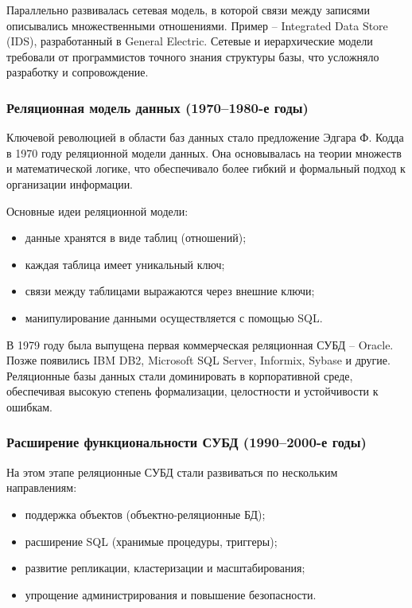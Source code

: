 Параллельно развивалась сетевая модель, в которой связи между записями описывались множественными отношениями. Пример -- Integrated Data Store (IDS), разработанный в General Electric. Сетевые и иерархические модели требовали от программистов точного знания структуры базы, что усложняло разработку и сопровождение.

\subsubsection{Реляционная модель данных (1970--1980-е годы)}

Ключевой революцией в области баз данных стало предложение Эдгара Ф. Кодда в 1970 году реляционной модели данных. Она основывалась на теории множеств и математической логике, что обеспечивало более гибкий и формальный подход к организации информации.

Основные идеи реляционной модели:
\begin{itemize}
	\item данные хранятся в виде таблиц (отношений);
	\item каждая таблица имеет уникальный ключ;
	\item связи между таблицами выражаются через внешние ключи;
	\item манипулирование данными осуществляется с помощью SQL.
\end{itemize}

В 1979 году была выпущена первая коммерческая реляционная СУБД -- Oracle. Позже появились IBM DB2, Microsoft SQL Server, Informix, Sybase и другие. Реляционные базы данных стали доминировать в корпоративной среде, обеспечивая высокую степень формализации, целостности и устойчивости к ошибкам.

\subsubsection{Расширение функциональности СУБД (1990--2000-е годы)}

На этом этапе реляционные СУБД стали развиваться по нескольким направлениям:
\begin{itemize}
	\item поддержка объектов (объектно-реляционные БД);
	\item расширение SQL (хранимые процедуры, триггеры);
	\item развитие репликации, кластеризации и масштабирования;
	\item упрощение администрирования и повышение безопасности.
\end{itemize}

